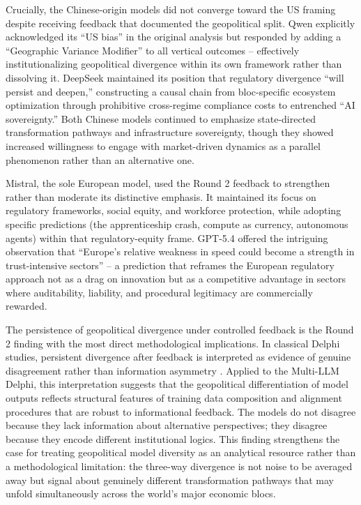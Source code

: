 \documentclass[preprint,review,12pt]{elsarticle}
\begin{document}
Crucially, the Chinese-origin models did not converge toward the US framing despite receiving feedback that documented the geopolitical split. Qwen explicitly acknowledged its ``US bias'' in the original analysis but responded by adding a ``Geographic Variance Modifier'' to all vertical outcomes -- effectively institutionalizing geopolitical divergence within its own framework rather than dissolving it. DeepSeek maintained its position that regulatory divergence ``will persist and deepen,'' constructing a causal chain from bloc-specific ecosystem optimization through prohibitive cross-regime compliance costs to entrenched ``AI sovereignty.'' Both Chinese models continued to emphasize state-directed transformation pathways and infrastructure sovereignty, though they showed increased willingness to engage with market-driven dynamics as a parallel phenomenon rather than an alternative one.

Mistral, the sole European model, used the Round 2 feedback to strengthen rather than moderate its distinctive emphasis. It maintained its focus on regulatory frameworks, social equity, and workforce protection, while adopting specific predictions (the apprenticeship crash, compute as currency, autonomous agents) within that regulatory-equity frame. GPT-5.4 offered the intriguing observation that ``Europe's relative weakness in speed could become a strength in trust-intensive sectors'' -- a prediction that reframes the European regulatory approach not as a drag on innovation but as a competitive advantage in sectors where auditability, liability, and procedural legitimacy are commercially rewarded.

The persistence of geopolitical divergence under controlled feedback is the Round 2 finding with the most direct methodological implications. In classical Delphi studies, persistent divergence after feedback is interpreted as evidence of genuine disagreement rather than information asymmetry \citep{vondergracht2012delphi}. Applied to the Multi-LLM Delphi, this interpretation suggests that the geopolitical differentiation of model outputs reflects structural features of training data composition and alignment procedures that are robust to informational feedback. The models do not disagree because they lack information about alternative perspectives; they disagree because they encode different institutional logics. This finding strengthens the case for treating geopolitical model diversity as an analytical resource rather than a methodological limitation: the three-way divergence is not noise to be averaged away but signal about genuinely different transformation pathways that may unfold simultaneously across the world's major economic blocs.
\end{document}
